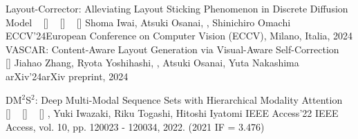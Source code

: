 
\begin{publications}
    \icpublication
    {Layout-Corrector: Alleviating Layout Sticking Phenomenon in Discrete Diffusion Model}
    {
    ~ [\href{https://link.springer.com/chapter/10.1007/978-3-031-72754-2_6}{\small{\doiSymbol}}]
    ~ [\href{https://arxiv.org/abs/2409.16689}{\small{\arxivSymbol}}]
    ~ [\href{https://github.com/line/Layout-Corrector}{\small{\githubSymbol}}]
    }
    {Shoma Iwai, Atsuki Osanai, \underline{}, Shinichiro Omachi}
    {ECCV'24}{European Conference on Computer Vision (ECCV), Milano, Italia, 2024}
    \icpublication
    {VASCAR: Content-Aware Layout Generation via Visual-Aware Self-Correction}
    {
    ~ [\href{https://arxiv.org/abs/2412.04237}{\small{\arxivSymbol}}]
    }
    {Jiahao Zhang, Ryota Yoshihashi, \underline{}, Atsuki Osanai, Yuta Nakashima}
    {arXiv'24}{arXiv preprint, 2024}

    \ijpublication
    {DM$^2$S$^2$: Deep Multi-Modal Sequence Sets with Hierarchical Modality Attention}
    {
    ~ [\href{https://doi.org/10.1109/ACCESS.2022.3221812}{\small{\doiSymbol}}]
    ~ [\href{https://arxiv.org/abs/2209.03126}{\small{\arxivSymbol}}]
    ~ [\href{https://doi.org/10.5281/zenodo.7050923}{\small{\linkSymbol}}]
    }
    {\underline{}, Yuki Iwazaki, Riku Togashi, Hitoshi Iyatomi}
    {IEEE Access'22} {IEEE Access, vol. 10, pp. 120023 - 120034, 2022. (2021 IF = 3.476)}
\end{publications}

